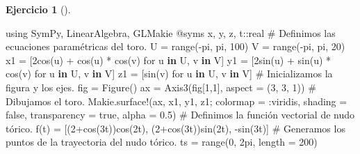 \documentclass[
  a4paper,
]{scrreport}
\newenvironment{Shaded}{\begin{snugshade}}{\end{snugshade}}
\newcommand{\BuiltInTok}[1]{\textcolor[rgb]{0.00,0.23,0.31}{#1}}
\newcommand{\CommentTok}[1]{\textcolor[rgb]{0.37,0.37,0.37}{#1}}
\newcommand{\ConstantTok}[1]{\textcolor[rgb]{0.56,0.35,0.01}{#1}}
\newcommand{\DataTypeTok}[1]{\textcolor[rgb]{0.68,0.00,0.00}{#1}}
\newcommand{\FloatTok}[1]{\textcolor[rgb]{0.68,0.00,0.00}{#1}}
\newcommand{\FunctionTok}[1]{\textcolor[rgb]{0.28,0.35,0.67}{#1}}
\newcommand{\ImportTok}[1]{\textcolor[rgb]{0.00,0.46,0.62}{#1}}
\newcommand{\KeywordTok}[1]{\textcolor[rgb]{0.00,0.23,0.31}{\textbf{#1}}}
\newcommand{\NormalTok}[1]{\textcolor[rgb]{0.00,0.23,0.31}{#1}}
\newcommand{\OperatorTok}[1]{\textcolor[rgb]{0.37,0.37,0.37}{#1}}
\newcommand{\PreprocessorTok}[1]{\textcolor[rgb]{0.68,0.00,0.00}{#1}}
\theoremstyle{definition}
\newtheorem{exercise}{Ejercicio}[chapter]
\theoremstyle{remark}
\begin{document}
\begin{exercise}[]
\begin{tcolorbox}
\begin{Shaded}
\begin{Highlighting}[]
\ImportTok{using} \BuiltInTok{SymPy}\NormalTok{, }\BuiltInTok{LinearAlgebra}\NormalTok{, }\BuiltInTok{GLMakie}
\PreprocessorTok{@syms}\NormalTok{ x, y, z, t}\OperatorTok{::}\DataTypeTok{real}
\CommentTok{\# Definimos las ecuaciones paramétricas del toro.}
\NormalTok{U }\OperatorTok{=} \FunctionTok{range}\NormalTok{(}\OperatorTok{{-}}\ConstantTok{pi}\NormalTok{, }\ConstantTok{pi}\NormalTok{, }\FloatTok{100}\NormalTok{)}
\NormalTok{V }\OperatorTok{=} \FunctionTok{range}\NormalTok{(}\OperatorTok{{-}}\ConstantTok{pi}\NormalTok{, }\ConstantTok{pi}\NormalTok{, }\FloatTok{20}\NormalTok{)}
\NormalTok{x1 }\OperatorTok{=}\NormalTok{ [}\FloatTok{2}\FunctionTok{cos}\NormalTok{(u) }\OperatorTok{+} \FunctionTok{cos}\NormalTok{(u) }\OperatorTok{*} \FunctionTok{cos}\NormalTok{(v) for u }\KeywordTok{in}\NormalTok{ U, v }\KeywordTok{in}\NormalTok{ V]}
\NormalTok{y1 }\OperatorTok{=}\NormalTok{ [}\FloatTok{2}\FunctionTok{sin}\NormalTok{(u) }\OperatorTok{+} \FunctionTok{sin}\NormalTok{(u) }\OperatorTok{*} \FunctionTok{cos}\NormalTok{(v) for u }\KeywordTok{in}\NormalTok{ U, v }\KeywordTok{in}\NormalTok{ V]}
\NormalTok{z1 }\OperatorTok{=}\NormalTok{ [}\FunctionTok{sin}\NormalTok{(v) for u }\KeywordTok{in}\NormalTok{ U, v }\KeywordTok{in}\NormalTok{ V]}
\CommentTok{\# Inicializamos la figura y los ejes.}
\NormalTok{fig }\OperatorTok{=} \FunctionTok{Figure}\NormalTok{()}
\NormalTok{ax }\OperatorTok{=} \FunctionTok{Axis3}\NormalTok{(fig[}\FloatTok{1}\NormalTok{,}\FloatTok{1}\NormalTok{], aspect }\OperatorTok{=}\NormalTok{ (}\FloatTok{3}\NormalTok{, }\FloatTok{3}\NormalTok{, }\FloatTok{1}\NormalTok{))}
\CommentTok{\# Dibujamos el toro.}
\NormalTok{Makie.}\FunctionTok{surface!}\NormalTok{(ax, x1, y1, z1; colormap }\OperatorTok{=} \OperatorTok{:}\NormalTok{viridis, shading }\OperatorTok{=} \ConstantTok{false}\NormalTok{, transparency }\OperatorTok{=} \ConstantTok{true}\NormalTok{, alpha }\OperatorTok{=} \FloatTok{0.5}\NormalTok{)}
\CommentTok{\# Definimos la función vectorial de nudo tórico.}
\FunctionTok{f}\NormalTok{(t) }\OperatorTok{=}\NormalTok{ [(}\FloatTok{2}\FunctionTok{+cos}\NormalTok{(}\FloatTok{3}\NormalTok{t))}\FunctionTok{cos}\NormalTok{(}\FloatTok{2}\NormalTok{t), (}\FloatTok{2}\FunctionTok{+cos}\NormalTok{(}\FloatTok{3}\NormalTok{t))}\FunctionTok{sin}\NormalTok{(}\FloatTok{2}\NormalTok{t), }\FunctionTok{{-}sin}\NormalTok{(}\FloatTok{3}\NormalTok{t)] }
\CommentTok{\# Generamos los puntos de la trayectoria del nudo tórico.}
\NormalTok{ts }\OperatorTok{=} \FunctionTok{range}\NormalTok{(}\FloatTok{0}\NormalTok{, }\FloatTok{2}\NormalTok{pi, length }\OperatorTok{=} \FloatTok{200}\NormalTok{)}

\end{Highlighting}
\end{Shaded}
\end{tcolorbox}
\end{exercise}
\end{document}
